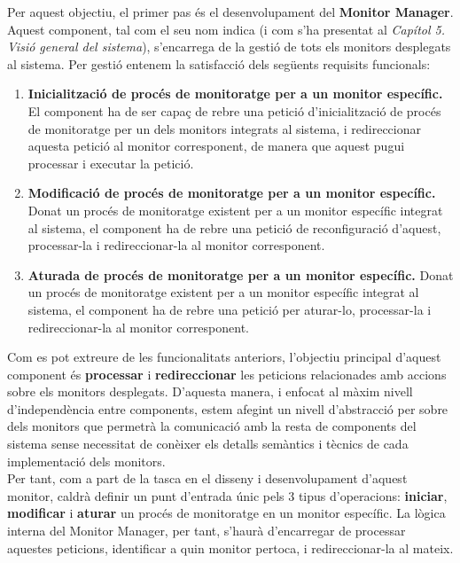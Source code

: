 Per aquest objectiu, el primer pas és el desenvolupament del \textbf{Monitor Manager}. Aquest component, tal com el seu nom indica (i com s'ha presentat al \textit{Capítol 5. Visió general del sistema}), s'encarrega de la gestió de tots els monitors desplegats al sistema. Per gestió entenem la satisfacció dels següents requisits funcionals:

\begin{enumerate}
\item \textbf{Inicialització de procés de monitoratge per a un monitor específic.} El component ha de ser capaç de rebre una petició d'inicialització de procés de monitoratge per un dels monitors integrats al sistema, i redireccionar aquesta petició al monitor corresponent, de manera que aquest pugui processar i executar la petició.
\item \textbf{Modificació de procés de monitoratge per a un monitor específic.} Donat un procés de monitoratge existent per a un monitor específic integrat al sistema, el component ha de rebre una petició de reconfiguració d'aquest, processar-la i redireccionar-la al monitor corresponent.
\item \textbf{Aturada de procés de monitoratge per a un monitor específic.} Donat un procés de monitoratge existent per a un monitor específic integrat al sistema, el component ha de rebre una petició per aturar-lo, processar-la i redireccionar-la al monitor corresponent.
\end{enumerate}

Com es pot extreure de les funcionalitats anteriors, l'objectiu principal d'aquest component és \textbf{processar} i \textbf{redireccionar} les peticions relacionades amb accions sobre els monitors desplegats. D'aquesta manera, i enfocat al màxim nivell d'independència entre components, estem afegint un nivell d'abstracció per sobre dels monitors que permetrà la comunicació amb la resta de components del sistema sense necessitat de conèixer els detalls semàntics i tècnics de cada implementació dels monitors.\\

Per tant, com a part de la tasca en el disseny i desenvolupament d'aquest monitor, caldrà definir un punt d'entrada únic pels 3 tipus d'operacions: \textbf{iniciar}, \textbf{modificar} i \textbf{aturar} un procés de monitoratge en un monitor específic. La lògica interna del Monitor Manager, per tant, s'haurà d'encarregar de processar aquestes peticions, identificar a quin monitor pertoca, i redireccionar-la al mateix.

